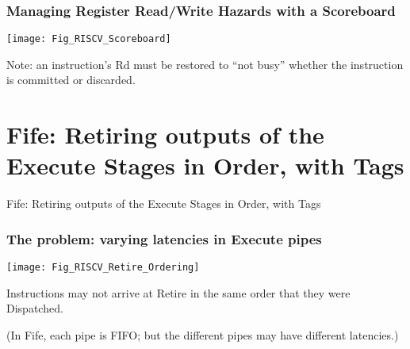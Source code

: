 \begin{frame}[fragile]
\frametitle{Managing Register Read/Write Hazards with a Scoreboard}

\footnotesize

\begin{center}
 \texttt{[image: Fig\_RISCV\_Scoreboard]}
\end{center}

\vspace{2ex}

Note: an instruction's Rd must be restored to ``not busy'' whether the
instruction is committed or discarded.

\end{frame}


\section{Fife: Retiring outputs of the Execute Stages in Order, with Tags}

\begin{frame}

\begin{center}
  {\LARGE Fife: Retiring outputs of the Execute Stages in Order, with Tags}
\end{center}

\end{frame}


\begin{frame}[fragile]
\frametitle{The problem: varying latencies in Execute pipes}

\footnotesize

\begin{center}
 \texttt{[image: Fig\_RISCV\_Retire\_Ordering]}
\end{center}

\vspace{1ex}

Instructions may not arrive at Retire in the same order that they were Dispatched.

\vspace{1ex}

(In Fife, each pipe is FIFO; but the different pipes may have different latencies.)

\end{frame}


